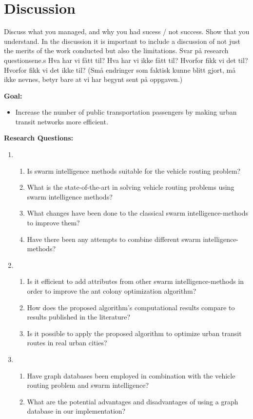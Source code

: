 \section{Discussion}

Discuss what you managed, and why you had sucess / not success. Show that you understand. In the discussion it is important to include a discussion of not just the merits of the work conducted but also the limitations.
\newline
Svar på research questionsene.s
Hva har vi fått til? Hva har vi ikke fått til? Hvorfor fikk vi det til? Hvorfor fikk vi det ikke til? (Små endringer som faktisk kunne blitt gjort, må ikke nevnes, betyr bare at vi har begynt sent på oppgaven.)

\textbf{Goal:}
\begin{itemize}
\item  Increase the number of public transportation passengers by making urban transit networks more efficient.
\end{itemize}
\textbf{Research Questions:}
\begin{enumerate}[label=\textbf{\arabic*})]
\item 
    \begin{enumerate}
    \item  Is swarm intelligence methods suitable for the vehicle routing problem?
    \item  What is the state-of-the-art in solving vehicle routing problems using swarm intelligence methods?
    \item  What changes have been done to the classical swarm intelligence-methods to improve them?
    \item  Have there been any attempts to combine different swarm intelligence-methods?
	\end{enumerate}
\item
    \begin{enumerate}
    \item  Is it efficient to add attributes from other swarm intelligence-methods in order to improve the ant colony optimization algorithm?
    \item  How does the proposed algorithm's computational results compare to results published in the literature?
    \item  Is it possible to apply the proposed algorithm to optimize urban transit routes in real urban cities?
    \end{enumerate}
\item
	\begin{enumerate}
    \item  Have graph databases been employed in combination with the vehicle routing problem and swarm intelligence?
	\item  What are the potential advantages and disadvantages of using a graph database in our implementation?
    \end{enumerate}
\end{enumerate}

